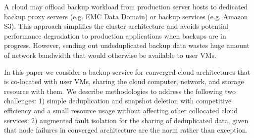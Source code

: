 A cloud may offload backup workload from production 
server hosts to dedicated backup proxy servers (e.g. EMC Data Domain) or
backup services (e.g. Amazon S3). This approach simplifies the cluster 
architecture and 
avoids potential performance degradation to production applications when 
backups are in progress.
However, sending out undeduplicated backup data wastes huge amount
of network bandwidth that would otherwise be available to user VMs. 

In this paper we consider a backup service for converged cloud architectures
that is co-located with user VMs, sharing the cloud computer, network, and
storage resource with them.
We describe methodologies to address the following two challenges: 
1) simple deduplication and snapshot deletion with competitive efficiency and 
a small resource usage without affecting other collocated cloud services;
2) augmented fault isolation for the sharing of deduplicated data,
given that node failures in converged architecture are the norm rather than
exception. 


 

